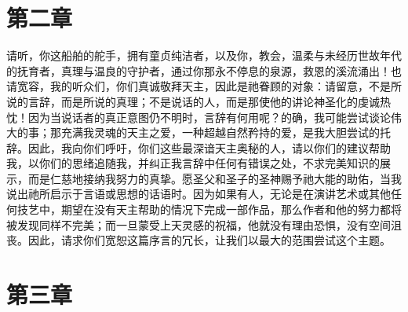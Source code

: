 
\section{第二章 }

请听，你这船舶的舵手，拥有童贞纯洁者，以及你，教会，温柔与未经历世故年代的抚育者，真理与温良的守护者，通过你那永不停息的泉源，救恩的溪流涌出！也请宽容，我的听众们，你们真诚敬拜天主，因此是祂眷顾的对象：请留意，不是所说的言辞，而是所说的真理；不是说话的人，而是那使他的讲论神圣化的虔诚热忱！因为当说话者的真正意图仍不明时，言辞有何用呢？的确，我可能尝试谈论伟大的事；那充满我灵魂的天主之爱，一种超越自然矜持的爱，是我大胆尝试的托辞。因此，我向你们呼吁，你们这些最深谙天主奥秘的人，请以你们的建议帮助我，以你们的思绪追随我，并纠正我言辞中任何有错误之处，不求完美知识的展示，而是仁慈地接纳我努力的真挚。愿圣父和圣子的圣神赐予祂大能的助佑，当我说出祂所启示于言语或思想的话语时。因为如果有人，无论是在演讲艺术或其他任何技艺中，期望在没有天主帮助的情况下完成一部作品，那么作者和他的努力都将被发现同样不完美；而一旦蒙受上天灵感的祝福，他就没有理由恐惧，没有空间沮丧。因此，请求你们宽恕这篇序言的冗长，让我们以最大的范围尝试这个主题。\par


\section{第三章 }

